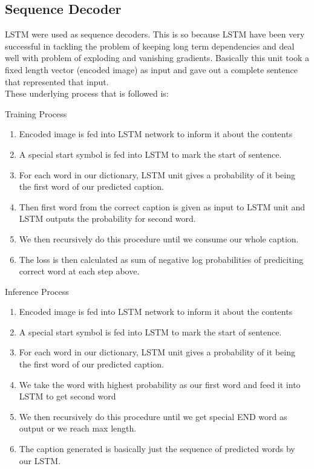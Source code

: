 \documentclass[11pt]{article}
\begin{document}
		\subsection{Sequence Decoder}
			LSTM were used as sequence decoders. This is so because LSTM have been very successful in tackling the problem of keeping long term dependencies and deal well with problem of exploding and vanishing gradients. Basically this unit took a fixed length vector (encoded image) as input and gave out a complete sentence that represented that input.\\
			These underlying process that is followed is:
			\begin{subsubsection}{Training Process}
				\begin{enumerate}
				\item Encoded image is fed into LSTM network to inform it about the contents
				\item A special start symbol is fed into LSTM to mark the start of sentence.
				\item For each word in our dictionary, LSTM unit gives a probability of it being the first word of our predicted caption.
				\item Then first word from the correct caption is given as input to LSTM unit and LSTM outputs the probability for second word.
				\item We then recursively do this procedure until we consume our whole caption.
				\item The loss is then calculated as sum of negative log probabilities of prediciting correct word at each step above.
				\end{enumerate}
			\end{subsubsection}
			\begin{subsubsection}{Inference Process}
				\begin{enumerate}
				\item Encoded image is fed into LSTM network to inform it about the contents
				\item A special start symbol is fed into LSTM to mark the start of sentence.
				\item For each word in our dictionary, LSTM unit gives a probability of it being the first word of our predicted caption.
				\item We take the word with highest probability as our first word and feed it into LSTM to get second word
				\item We then recursively do this procedure until we get special END word as output or we reach max length.
				\item The caption generated is basically just the sequence of predicted words by our LSTM.
				\end{enumerate}
			\end{subsubsection}
\end{document}
